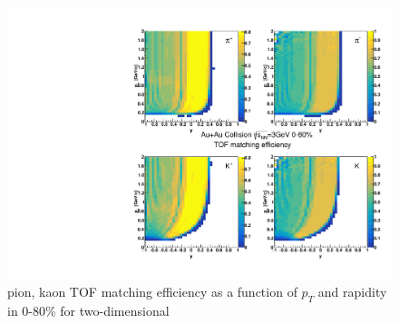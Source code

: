 \begin{figure}
    \centering
    \includegraphics[scale=0.5]{FXT3gev/chapter2/fig/eff/pik_tofeff.pdf}
    \caption{pion, kaon TOF matching efficiency as a function of $p_{T}$ and rapidity in 0-80\% for two-dimensional}
    \label{fig:pik_eff_tof}
\end{figure}

